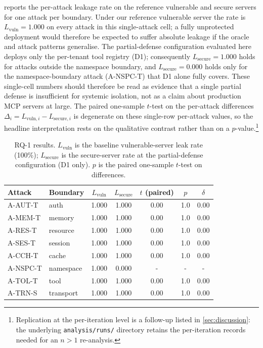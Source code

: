 \documentclass[sigconf, anonymous, natbib=false]{acmart}
\begin{document}
 reports the per-attack leakage rate on the
reference vulnerable and secure servers for one attack per
boundary. Under our reference vulnerable server the
rate is $L_{\text{vuln}} = 1.000$ on every attack in this
single-attack cell; a fully unprotected deployment would
therefore be expected to suffer absolute leakage if the
oracle and attack patterns generalise. The partial-defense
configuration evaluated here deploys only the per-tenant
tool registry (D1); consequently $L_{\text{secure}} =
1.000$ holds for attacks outside the namespace boundary,
and $L_{\text{secure}} = 0.000$ holds only for the
namespace-boundary attack (A-NSPC-T) that D1 alone fully
covers. These single-cell numbers should therefore be read
as evidence that a single partial defense is insufficient
for systemic isolation, not as a claim about production
MCP servers at large. The paired one-sample $t$-test on the
per-attack differences $\Delta_i = L_{\text{vuln},i} -
L_{\text{secure},i}$ is degenerate on these single-row
per-attack values, so the headline interpretation rests on
the qualitative contrast rather than on a $p$-value.\footnote{
Replication at the per-iteration level is a follow-up
listed in \cref{sec:discussion}: the underlying
\texttt{analysis/runs/} directory retains the per-iteration
records needed for an $n > 1$ re-analysis.}

\begin{table}[t]
\caption{RQ-1 results. $L_{\text{vuln}}$ is the baseline
vulnerable-server leak rate (100\%); $L_{\text{secure}}$ is the
secure-server rate at the partial-defense configuration (D1 only).
$p$ is the paired one-sample $t$-test on differences.}
\label{tab:rq1}
\centering
\small
\begin{tabularx}{\linewidth}{X l c c c c c}
\toprule
Attack & Boundary
       & $L_{\text{vuln}}$ & $L_{\text{secure}}$
       & $t$ (paired) & $p$ & $\delta$ \\
\midrule
A-AUT-T & auth       & 1.000 & 1.000 & 0.00 & 1.0 & 0.00 \\
A-MEM-T & memory     & 1.000 & 1.000 & 0.00 & 1.0 & 0.00 \\
A-RES-T & resource   & 1.000 & 1.000 & 0.00 & 1.0 & 0.00 \\
A-SES-T & session    & 1.000 & 1.000 & 0.00 & 1.0 & 0.00 \\
A-CCH-T & cache      & 1.000 & 1.000 & 0.00 & 1.0 & 0.00 \\
A-NSPC-T & namespace & 1.000 & 0.000 & -    & -   & -    \\
A-TOL-T & tool       & 1.000 & 1.000 & 0.00 & 1.0 & 0.00 \\
A-TRN-S & transport  & 1.000 & 1.000 & 0.00 & 1.0 & 0.00 \\
\bottomrule
\end{tabularx}
\end{table}
\end{document}
